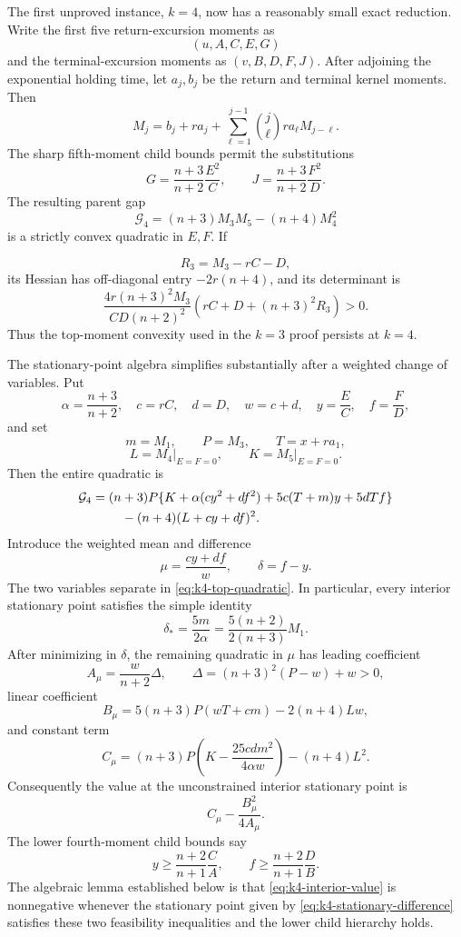 \documentclass[11pt]{article}
\theoremstyle{remark}
\begin{document}
The first unproved instance, \(k=4\), now has a reasonably small exact
reduction.  Write the first five return-excursion moments as
\[
 (u,A,C,E,G)
\]
and the terminal-excursion moments as \((v,B,D,F,J)\).  After adjoining the
exponential holding time, let \(a_j,b_j\) be the return and terminal kernel
moments.  Then
\[
 M_j=b_j+ra_j+\sum_{\ell=1}^{j-1}\binom j\ell ra_\ell M_{j-\ell}.
\]
The sharp fifth-moment child bounds permit the substitutions
\[
 G=\frac{n+3}{n+2}\frac{E^2}{C},
 \qquad
 J=\frac{n+3}{n+2}\frac{F^2}{D}.
\]
The resulting parent gap
\[
 \mathcal G_4=(n+3)M_3M_5-(n+4)M_4^2
\]
is a strictly convex quadratic in \(E,F\).  If

\[
 R_3=M_3-rC-D,
\]
its Hessian has off-diagonal entry \(-2r(n+4)\), and its determinant is
\[
 \frac{4r(n+3)^2M_3}{CD(n+2)^2}
 \left(rC+D+(n+3)^2R_3\right)>0.
\]
Thus the top-moment convexity used in the \(k=3\) proof persists at \(k=4\).

The stationary-point algebra simplifies substantially after a weighted
change of variables.  Put
\[
 \alpha=\frac{n+3}{n+2},\quad
 c=rC,\quad d=D,\quad w=c+d,\quad
 y=\frac EC,\quad f=\frac FD,
\]
and set
\[
 m=M_1,\qquad P=M_3,\qquad T=x+ra_1,
\]
\[
 L=M_4\big|_{E=F=0},\qquad
 K=M_5\big|_{E=F=0}.
\]
Then the entire quadratic is
\begin{align}
 \mathcal G_4={}&(n+3)P
 \{K+\alpha(cy^2+df^2)+5c(T+m)y+5dTf\}\notag\\
 &\quad -(n+4)(L+cy+df)^2.\label{eq:k4-top-quadratic}
\end{align}
Introduce the weighted mean and difference
\[
 \mu=\frac{cy+df}{w},\qquad \delta=f-y.
\]
The two variables separate in \eqref{eq:k4-top-quadratic}.  In particular,
every interior stationary point satisfies the simple identity
\begin{equation}\label{eq:k4-stationary-difference}
 \delta_*=\frac{5m}{2\alpha}
 =\frac{5(n+2)}{2(n+3)}M_1.
\end{equation}
After minimizing in \(\delta\), the remaining quadratic in \(\mu\) has leading
coefficient
\[
 A_\mu=\frac{w}{n+2}\Delta,
 \qquad
 \Delta=(n+3)^2(P-w)+w>0,
\]
linear coefficient
\[
 B_\mu=5(n+3)P(wT+cm)-2(n+4)Lw,
\]
and constant term
\[
 C_\mu=(n+3)P\left(K-\frac{25cdm^2}{4\alpha w}\right)
       -(n+4)L^2.
\]
Consequently the value at the unconstrained interior stationary point is
\begin{equation}\label{eq:k4-interior-value}
 C_\mu-\frac{B_\mu^2}{4A_\mu}.
\end{equation}
The lower fourth-moment child bounds say
\[
 y\geq\frac{n+2}{n+1}\frac CA,
 \qquad
 f\geq\frac{n+2}{n+1}\frac DB.
\]
The algebraic lemma established below is that
\eqref{eq:k4-interior-value} is nonnegative whenever the stationary point
given by \eqref{eq:k4-stationary-difference} satisfies these two feasibility
inequalities and the lower child hierarchy holds.
\end{document}
